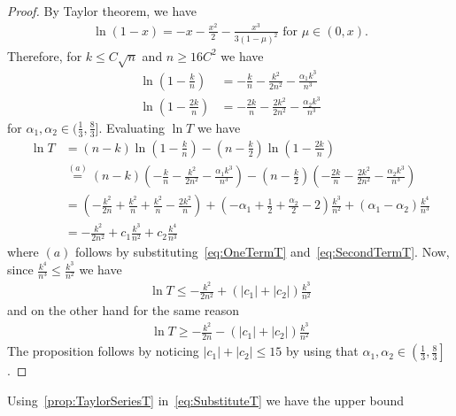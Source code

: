     \begin{proof}
        By Taylor theorem, we have 
        \begin{align}\label{eq:lnXBds}
            \ln(1-x) = -x - \frac{x^2}{2} - \frac{x^3}{3(1-\mu)^2} \text{ for } \mu \in (0,x).
        \end{align}
        Therefore, for $k \le C\sqrt{n}$ and $n \ge 16C^2$ we have 
        \begin{align}
            \ln\left(1-\frac{k}{n}\right) &= -\frac{k}{n} - \frac{k^2}{2n^2} - \frac{\alpha_1k^3}{n^3} \label{eq:OneTermT}\\
            \ln\left(1-\frac{2k}{n}\right) &= -\frac{2k}{n} - \frac{2k^2}{2n^2} - \frac{\alpha_2k^3}{n^3} \label{eq:SecondTermT}
        \end{align}
        for $\alpha_1,\alpha_2 \in \Big(\frac{1}{3},\frac{8}{3}\Big]$. Evaluating $\ln T$ we have 
        \begin{align}
            \ln T &= (n-k)\ln\left(1-\frac{k}{n}\right) - \left(n-\frac{k}{2}\right)\ln\left(1-\frac{2k}{n}\right)  \nonumber\\
            &\stackrel{(a)}{=} (n-k)\left(-\frac{k}{n} - \frac{k^2}{2n^2} - \frac{\alpha_1k^3}{n^3}\right) - \left(n-\frac{k}{2}\right)\left(-\frac{2k}{n} - \frac{2k^2}{2n^2} - \frac{\alpha_2k^3}{n^3}\right) \nonumber\\
            &= \left(-\frac{k^2}{2n}+\frac{k^2}{n}+\frac{k^2}{n}-\frac{2k^2}{n}\right)+\left(-\alpha_1+\frac{1}{2}+\frac{\alpha_2}{2}-2\right)\frac{k^3}{n^2}+\left(\alpha_1-\alpha_2\right)\frac{k^4}{n^3} \nonumber\\
            &= -\frac{k^2}{2n^2} + c_1\frac{k^3}{n^2} + c_2\frac{k^4}{n^3} \label{eq:subc1c2}
        \end{align}
        where $(a)$ follows by substituting~\cref{eq:OneTermT} and~\cref{eq:SecondTermT}. Now, since $\frac{k^4}{n^3} \le \frac{k^3}{n^2}$ we have 
        \begin{align}
         \ln T  \le  -\frac{k^2}{2n^2} +  (|c_1|+|c_2|)\frac{k^3}{n^2}
        \end{align}
        and on the other hand for the same reason 
        \begin{align}
            \ln T \ge -\frac{k^2}{2n} - (|c_1|+|c_2|)\frac{k^3}{n^2}
        \end{align}
        The proposition follows by noticing $|c_1|+|c_2| \le 15$ by using that $\alpha_1, \alpha_2 \in \left(\frac{1}{3},\frac{8}{3}\right]$.
    \end{proof}
Using~\cref{prop:TaylorSeriesT} in~\cref{eq:SubstituteT} we have the upper bound 
